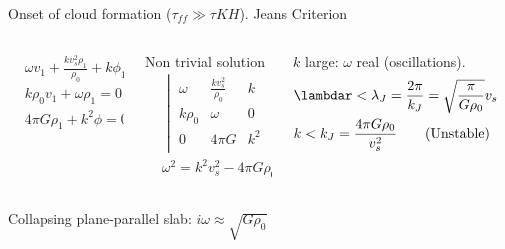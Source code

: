 \begin{frame}{Onset of cloud formation ($\tau_{ff}\gg\tau{KH}$). Jeans Criterion}
\begin{columns}[T]
	\begin{column}{0.3\textwidth}
		\begin{align*}
		&\omega v_1+\frac{kv_s^2\rho_1}{\rho_0}+k\phi_1=0\\
		&k\rho_0v_1+\omega\rho_1=0\\
		&4\pi G\rho_1+k^2\phi=0
		\end{align*}
	\end{column}
	\begin{column}{0.3\textwidth}
Non trivial solution
		\begin{align*}
		&\begin{vmatrix}
            \omega&\frac{kv_s^2}{\rho_0}&k\\
		k\rho_0&\omega&0\\
		0&4\pi G&k^2\\
		\end{vmatrix}=0\\
		&\omega^2=k^2v_s^2-4\pi G\rho_0
		\end{align*}
	\end{column}
	\begin{column}{0.4\textwidth}
$k$ large: $\omega$ real (oscillations). 
\begin{align*}
    &\lambdar<\lambda_J=\frac{2\pi}{k_J}=\sqrt{\frac{\pi}{G\rho_0}}v_s\tag{Stable}\\
    &k<k_J=\frac{4\pi G\rho_0}{v_s^2}\tag{Unstable}
\end{align*}
\end{column}
\end{columns}
Collapsing plane-parallel slab: $i\omega\approx\sqrt{G\rho_0}$
\end{frame}

